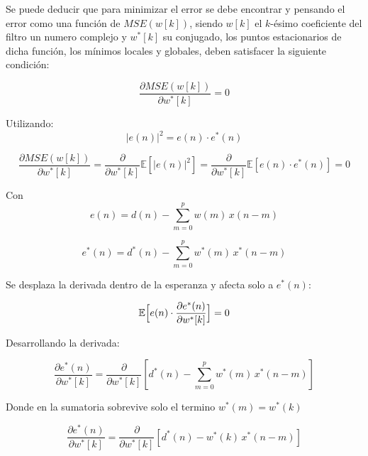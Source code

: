 \documentclass[a4paper]{article}
\begin{document}
Se puede deducir que para minimizar el error se debe encontrar y pensando el error como una función de $MSE(w[k])$, siendo $w[k]$ el $k$-ésimo coeficiente del filtro un numero complejo y $w^*[k]$ su conjugado, los puntos estacionarios de dicha función, los mínimos locales y globales, deben satisfacer la siguiente condición: 
 
 \begin{equation}
 		\frac{\partial MSE(w[k])}{\partial w^*[k]} = 0 
 \end{equation}

 Utilizando: 
 \begin{equation}
 	|e(n)|^{2} = e(n)\cdot e^{\ast} (n) 
 \end{equation}


  
 \begin{equation}
 	\frac{\partial MSE(w[k])}{\partial w^*[k]} = \frac{\partial }{\partial w^*[k]}  \mathbb{E}[|e(n)|^2] =\frac{\partial }{\partial w^*[k]}  \mathbb{E}[e(n)\cdot e^{\ast} (n) ]  = 0 
 \end{equation}
	
  Con 
  \begin{equation}
  	e(n) = d(n) - \sum_{m=0}^{p} w(m)\,x(n-m)
  \end{equation}
  
  \begin{equation}
  	e^*(n) = d^*(n) - \sum_{m=0}^{p} w^*(m)\,x^*(n-m)
  \end{equation}
	

	
  Se desplaza la derivada dentro de la esperanza y afecta solo a $	e^*(n) $:

  
	\begin{equation}
		\mathbb{E}\Bigl[e(n)\cdot\frac{\partial e^{\ast}(n)}{\partial w^*[k]}\Bigr] = 0
	\end{equation}

Desarrollando la derivada:

\begin{equation}
	\frac{\partial e^{\ast}(n)}{\partial w^*[k]} = \frac{	\partial }{\partial w^*[k]}[d^*(n) - \sum_{m=0}^{p} w^*(m)\,x^*(n-m)]
\end{equation}

Donde en la sumatoria sobrevive solo el termino $w^*(m) =w^*(k)$

\begin{equation}
	\frac{\partial e^{\ast}(n)}{\partial w^*[k]} = \frac{	\partial }{\partial w^*[k]}[d^*(n) -  w^*(k)\,x^*(n-m)]
\end{equation}
\end{document}
